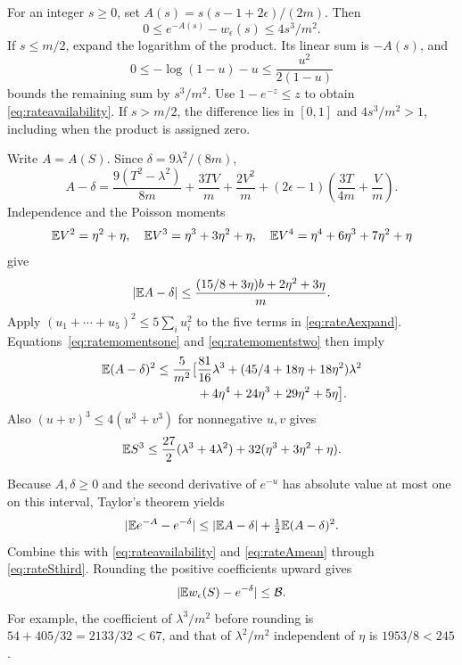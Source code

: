 For an integer $s\ge0$, set $A(s)=s(s-1+2\epsilon)/(2m)$. Then
\begin{equation}\label{eq:rateavailability}
0\le e^{-A(s)}-w_\epsilon(s)\le4s^3/m^2.
\end{equation}
If $s\le m/2$, expand the logarithm of the product. Its linear sum is $-A(s)$, and
\[
0\le-\log(1-u)-u\le\frac{u^2}{2(1-u)}
\]
bounds the remaining sum by $s^3/m^2$. Use $1-e^{-z}\le z$ to obtain \eqref{eq:rateavailability}. If $s>m/2$, the difference lies in $[0,1]$ and $4s^3/m^2>1$, including when the product is assigned zero.

Write $A=A(S)$. Since $\delta=9\lambda^2/(8m)$,
\begin{equation}\label{eq:rateAexpand}
A-\delta
=\frac{9(T^2-\lambda^2)}{8m}+\frac{3TV}{m}+\frac{2V^2}{m}
+(2\epsilon-1)\left(\frac{3T}{4m}+\frac Vm\right).
\end{equation}
Independence and the Poisson moments
\[
\mathbb E V^2=\eta^2+\eta,\quad
\mathbb E V^3=\eta^3+3\eta^2+\eta,\quad
\mathbb E V^4=\eta^4+6\eta^3+7\eta^2+\eta
\]
give
\begin{equation}\label{eq:rateAmean}
|\mathbb E A-\delta|
\le\frac{(15/8+3\eta)b+2\eta^2+3\eta}{m}.
\end{equation}
Apply $(u_1+\cdots+u_5)^2\le5\sum_i u_i^2$ to the five terms in \eqref{eq:rateAexpand}. Equations~\eqref{eq:ratemomentsone} and \eqref{eq:ratemomentstwo} then imply
\begin{equation}\label{eq:rateAsecond}
\begin{aligned}
\mathbb E(A-\delta)^2\le\frac5{m^2}\bigl[&\frac{81}{16}\lambda^3
+(45/4+18\eta+18\eta^2)\lambda^2\\
&+4\eta^4+24\eta^3+29\eta^2+5\eta\bigr].
\end{aligned}
\end{equation}
Also $(u+v)^3\le4(u^3+v^3)$ for nonnegative $u,v$ gives
\begin{equation}\label{eq:rateSthird}
\mathbb E S^3\le\frac{27}{2}(\lambda^3+4\lambda^2)
+32(\eta^3+3\eta^2+\eta).
\end{equation}

Because $A,\delta\ge0$ and the second derivative of $e^{-u}$ has absolute value at most one on this interval, Taylor's theorem yields
\[
|\mathbb E e^{-A}-e^{-\delta}|
\le|\mathbb E A-\delta|+\tfrac12\mathbb E(A-\delta)^2.
\]
Combine this with \eqref{eq:rateavailability} and \eqref{eq:rateAmean} through \eqref{eq:rateSthird}. Rounding the positive coefficients upward gives
\begin{equation}\label{eq:ratewerror}
|\mathbb E w_\epsilon(S)-e^{-\delta}|\le\mathcal B.
\end{equation}
For example, the coefficient of $\lambda^3/m^2$ before rounding is $54+405/32=2133/32<67$, and that of $\lambda^2/m^2$ independent of $\eta$ is $1953/8<245$.

